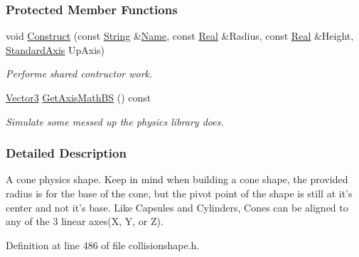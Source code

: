 \subsubsection*{Protected Member Functions}
\begin{DoxyCompactItemize}
\item 
void \hyperlink{classMezzanine_1_1ConeCollisionShape_a5a29f404442602af52499c684c792310}{Construct} (const \hyperlink{namespaceMezzanine_acf9fcc130e6ebf08e3d8491aebcf1c86}{String} \&\hyperlink{classMezzanine_1_1CollisionShape_aac524c5c56fa4d158bc071f8aecfbe79}{Name}, const \hyperlink{namespaceMezzanine_a726731b1a7df72bf3583e4a97282c6f6}{Real} \&Radius, const \hyperlink{namespaceMezzanine_a726731b1a7df72bf3583e4a97282c6f6}{Real} \&Height, \hyperlink{namespaceMezzanine_ab41a00a8c6a47b576dc987ec34e16ba1}{StandardAxis} UpAxis)
\begin{DoxyCompactList}\small\item\em Performe shared contructor work. \item\end{DoxyCompactList}\item 
\hyperlink{classMezzanine_1_1Vector3}{Vector3} \hyperlink{classMezzanine_1_1ConeCollisionShape_aa4a1f1f839c3b6761b27b129b60c8e89}{GetAxisMathBS} () const 
\begin{DoxyCompactList}\small\item\em Simulate some messed up the physics library does. \item\end{DoxyCompactList}\end{DoxyCompactItemize}


\subsubsection{Detailed Description}
A cone physics shape. Keep in mind when building a cone shape, the provided radius is for the base of the cone, but the pivot point of the shape is still at it's center and not it's base. Like Capsules and Cylinders, Cones can be aligned to any of the 3 linear axes(X, Y, or Z). 

Definition at line 486 of file collisionshape.h.



